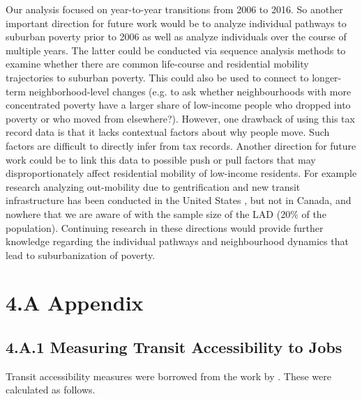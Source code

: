 Our analysis focused on year-to-year transitions from 2006 to 2016. So another important direction for future work would be to analyze individual pathways to suburban poverty prior to 2006 as well as analyze individuals over the course of multiple years. The latter could be conducted via sequence analysis methods to examine whether there are common life-course and residential mobility trajectories to suburban poverty. This could also be used to connect to longer-term neighborhood-level changes (e.g. to ask whether neighbourhoods with more concentrated poverty have a larger share of low-income people who dropped into poverty or who moved from elsewhere?). However, one drawback of using this tax record data is that it lacks contextual factors about why people move. Such factors are difficult to directly infer from tax records. Another direction for future work could be to link this data to possible push or pull factors that may disproportionately affect residential mobility of low-income residents. For example research analyzing out-mobility due to gentrification and new transit infrastructure has been conducted in the United States \cite{freeman_displacement_2005,delmelle_new_2020}, but not in Canada, and nowhere that we are aware of with the sample size of the LAD (20\% of the population). Continuing research in these directions would provide further knowledge regarding the individual pathways and neighbourhood dynamics that lead to suburbanization of poverty.






\section*{4.A \hspace{1mm} Appendix}

\subsection*{4.A.1 \hspace{2mm} Measuring Transit Accessibility to Jobs}


Transit accessibility measures were borrowed from the work by . These were calculated as follows.

